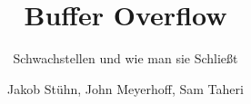\documentclass{beamer}
\title{Buffer Overflow}
\subtitle{Schwachstellen und wie man sie Schließt}
\author{Jakob Stühn, John Meyerhoff, Sam Taheri}
\institute{H-BRS}
\begin{document}
\frame{\titlepage}



\end{document}
